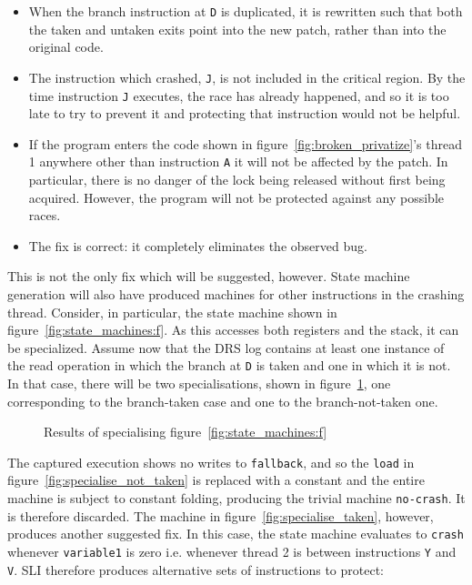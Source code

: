 \documentclass[10pt,twocolumn,preprint,natbib,authoryear]{sigplanconf}
\begin{document}
\begin{itemize}
\item When the branch instruction at \verb|D| is duplicated, it is
  rewritten such that both the taken and untaken exits point into the
  new patch, rather than into the original code.
\item The instruction which crashed, \verb|J|, is not included in the
  critical region.  By the time instruction \verb|J| executes, the
  race has already happened, and so it is too late to try to prevent
  it and protecting that instruction would not be helpful.
\item If the program enters the code shown in
  figure~\ref{fig:broken_privatize}'s thread 1 anywhere other than
  instruction \verb|A| it will not be affected by the patch.  In
  particular, there is no danger of the lock being released without
  first being acquired.  However, the program will not be protected
  against any possible races.
\item The fix is correct: it completely eliminates the observed bug.
\end{itemize}

This is not the only fix which will be suggested, however.  State
machine generation will also have produced machines for other
instructions in the crashing thread.  Consider, in particular, the
state machine shown in figure~\ref{fig:state_machines:f}.  As this
accesses both registers and the stack, it can be specialized.  Assume
now that the DRS log contains at least one instance of the read
operation in which the branch at \verb|D| is taken and one in which it
is not.  In that case, there will be two specialisations, shown in
figure~\ref{fig:example_specialisations}, one corresponding to the
branch-taken case and one to the branch-not-taken one.

\begin{figure}[thb]
\caption{Results of specialising figure~\ref{fig:state_machines:f}}
\label{fig:example_specialisations}
\end{figure}

The captured execution shows no writes to \verb|fallback|, and so the
\verb|load| in figure~\ref{fig:specialise_not_taken} is replaced with
a constant and the entire machine is subject to constant folding,
producing the trivial machine \verb|no-crash|.  It is therefore
discarded.  The machine in figure~\ref{fig:specialise_taken}, however,
produces another suggested fix.  In this case, the state machine
evaluates to \verb|crash| whenever \verb|variable1| is zero
i.e. whenever thread 2 is between instructions \verb|Y| and \verb|V|.
SLI therefore produces alternative sets of instructions to protect:
\end{document}
